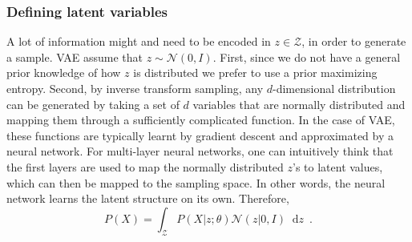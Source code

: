 \documentclass[12pt]{article}
\newcommand*\diff{\mathop{}\!\mathrm{d}}
\begin{document}
\subsubsection{Defining latent variables}
%
A lot of information might and need to be encoded in $z \in \mathcal{Z}$, in order to generate a sample.
VAE assume that $z \sim \mathcal{N}(0, I)$.
First, since we do not have a general prior knowledge of how $z$ is distributed we prefer to use a prior maximizing entropy.
Second, by inverse transform sampling, any $d$-dimensional distribution can be generated by taking a set of $d$ variables that are normally distributed and mapping them through a sufficiently complicated function.
In the case of VAE, these functions are typically learnt by gradient descent and approximated by a neural network.
For multi-layer neural networks, one can intuitively think that the first layers are used to map the normally distributed $z$'s to latent values, which can then be mapped to the sampling space.
In other words, the neural network learns the latent structure on its own. Therefore,
%
\begin{equation}
    P(X) = \int_{\mathcal{Z}}
    P(X \vert z; \theta)
    \mathcal{N}(z \vert 0, I)
    \diff z
    \enspace .
\end{equation}
\end{document}
